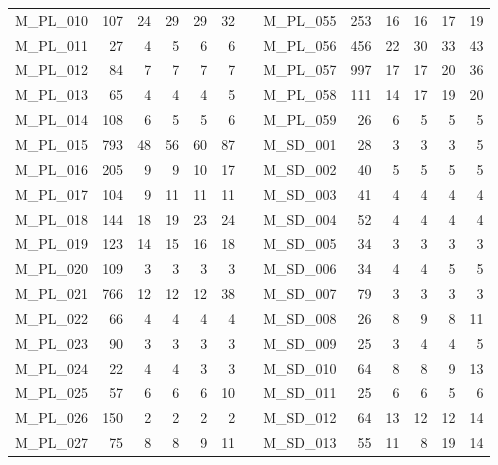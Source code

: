\begin{table}[htbp]
\begin{tabular}{lrrrrrrrrrrrr}
    M\_PL\_010 & 107  & 24   & 29   & 29   & 32   &      & M\_PL\_055 & 253  & 16   & 16   & 17   & 19 \\
    M\_PL\_011 & 27   & 4    & 5    & 6    & 6    &      & M\_PL\_056 & 456  & 22   & 30   & 33   & 43 \\
    M\_PL\_012 & 84   & 7    & 7    & 7    & 7    &      & M\_PL\_057 & 997  & 17   & 17   & 20   & 36 \\
    M\_PL\_013 & 65   & 4    & 4    & 4    & 5    &      & M\_PL\_058 & 111  & 14   & 17   & 19   & 20 \\
    M\_PL\_014 & 108  & 6    & 5    & 5    & 6    &      & M\_PL\_059 & 26   & 6    & 5    & 5    & 5 \\
    M\_PL\_015 & 793  & 48   & 56   & 60   & 87   &      & M\_SD\_001 & 28   & 3    & 3    & 3    & 5 \\
    M\_PL\_016 & 205  & 9    & 9    & 10   & 17   &      & M\_SD\_002 & 40   & 5    & 5    & 5    & 5 \\
    M\_PL\_017 & 104  & 9    & 11   & 11   & 11   &      & M\_SD\_003 & 41   & 4    & 4    & 4    & 4 \\
    M\_PL\_018 & 144  & 18   & 19   & 23   & 24   &      & M\_SD\_004 & 52   & 4    & 4    & 4    & 4 \\
    M\_PL\_019 & 123  & 14   & 15   & 16   & 18   &      & M\_SD\_005 & 34   & 3    & 3    & 3    & 3 \\
    M\_PL\_020 & 109  & 3    & 3    & 3    & 3    &      & M\_SD\_006 & 34   & 4    & 4    & 5    & 5 \\
    M\_PL\_021 & 766  & 12   & 12   & 12   & 38   &      & M\_SD\_007 & 79   & 3    & 3    & 3    & 3 \\
    M\_PL\_022 & 66   & 4    & 4    & 4    & 4    &      & M\_SD\_008 & 26   & 8    & 9    & 8    & 11 \\
    M\_PL\_023 & 90   & 3    & 3    & 3    & 3    &      & M\_SD\_009 & 25   & 3    & 4    & 4    & 5 \\
    M\_PL\_024 & 22   & 4    & 4    & 3    & 3    &      & M\_SD\_010 & 64   & 8    & 8    & 9    & 13 \\
    M\_PL\_025 & 57   & 6    & 6    & 6    & 10   &      & M\_SD\_011 & 25   & 6    & 6    & 5    & 6 \\
    M\_PL\_026 & 150  & 2    & 2    & 2    & 2    &      & M\_SD\_012 & 64   & 13   & 12   & 12   & 14 \\
    M\_PL\_027 & 75   & 8    & 8    & 9    & 11   &      & M\_SD\_013 & 55   & 11   & 8    & 19   & 14 \\

\end{tabular}
\end{table}
